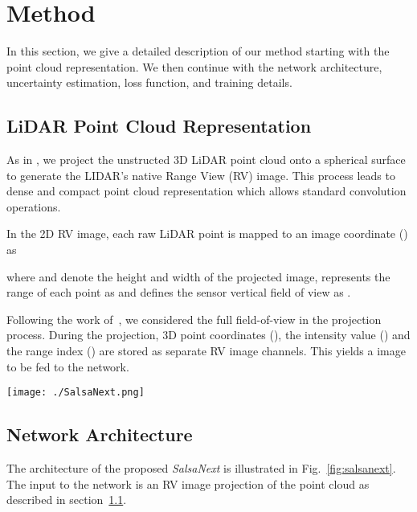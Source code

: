 \documentclass[letterpaper, 10 pt, conference]{ieeeconf}
\newcommand{\snx}[1]{\textit{SalsaNext }{#1}}
\begin{document}
\section{Method}
In this section, we give a detailed description of our  method starting with the point cloud representation. We then continue with the network architecture, uncertainty estimation, loss function, and training details.


\subsection{LiDAR Point Cloud Representation}
\label{sec:projection}

As in \cite{rangenetpp}, we project the unstructed 3D LiDAR point cloud  onto a spherical surface to generate the LIDAR's native Range View (RV) image. This process leads to dense and compact point cloud representation which  allows standard convolution operations. 

In the 2D RV image, each raw LiDAR  point  is mapped to an image coordinate  () as  



where  and  denote the height and width of the projected image,  represents the range of each point as   and  defines the sensor vertical field of view as .   

Following the work of~\cite{rangenetpp}, we considered the full   field-of-view in the projection process. During the projection, 3D point  coordinates (), the intensity value () and the range index ()  are  stored as separate RV image channels. This   yields a  image to be fed to the network. 
  

\begin{figure*}[!t]
    \centering
    \texttt{[image: ./SalsaNext.png]}
    \caption{Architecture of the proposed \textit{SalsaNext} model.  Blocks with dashed edges indicate  those that do not employ the dropout. The layer elements  and  represent the kernel size, dilation rate and batch normalization, respectively.   }
    \label{fig:salsanext}
\end{figure*}

\subsection{Network Architecture}

The   architecture of the proposed \snx is illustrated in Fig.~\ref{fig:salsanext}. 
The input to the network is an RV image projection of the point cloud as described in section~\ref{sec:projection}. 
\end{document}
